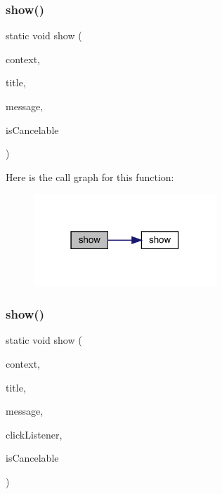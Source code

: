 \subsubsection{\texorpdfstring{show()}{show()}\hspace{0.1cm}{\footnotesize\ttfamily [2/6]}}
{\footnotesize\ttfamily static void show (\begin{DoxyParamCaption}\item[{@Non\+Null final Context}]{context,  }\item[{@Non\+Null final String}]{title,  }\item[{@Non\+Null final String}]{message,  }\item[{final boolean}]{is\+Cancelable }\end{DoxyParamCaption})\hspace{0.3cm}{\ttfamily [static]}}

Here is the call graph for this function\+:
\nopagebreak
\begin{figure}[H]
\begin{center}
\leavevmode
\includegraphics[width=195pt]{classcom_1_1toast_1_1android_1_1gamebase_1_1base_1_1ui_1_1_simple_alert_dialog_ae4ff10da4393b7fabc3105e1174fd81e_cgraph}
\end{center}
\end{figure}
\mbox{\label{classcom_1_1toast_1_1android_1_1gamebase_1_1base_1_1ui_1_1_simple_alert_dialog_a031f7fecb54ba0724285ad5f9c991913}} 
\subsubsection{\texorpdfstring{show()}{show()}\hspace{0.1cm}{\footnotesize\ttfamily [3/6]}}
{\footnotesize\ttfamily static void show (\begin{DoxyParamCaption}\item[{@Non\+Null final Context}]{context,  }\item[{@Non\+Null final String}]{title,  }\item[{@Non\+Null final String}]{message,  }\item[{@Nullable final Dialog\+Interface.\+On\+Click\+Listener}]{click\+Listener,  }\item[{final boolean}]{is\+Cancelable }\end{DoxyParamCaption})\hspace{0.3cm}{\ttfamily [static]}}

